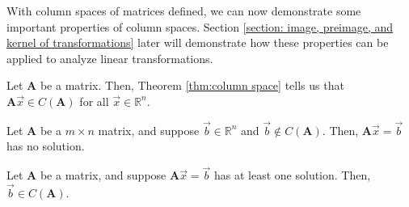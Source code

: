 \documentclass[]{book}
\newcommand{\mat}[1]{\ensuremath{\mathbf{#1}}}
\begin{document}
With column spaces of matrices defined, we can now demonstrate some important properties of column spaces. Section \ref{section: image, preimage, and kernel of transformations} later will demonstrate how these properties can be applied to analyze linear transformations.
\begin{corollary}
    Let $\mat{A}$ be a matrix. Then, Theorem \ref{thm:column space} tells us that $\mat{A} \vec{x} \in C(\mat{A})$ for all $\vec{x} \in \mathbb{R}^n$.
\end{corollary}
\begin{example}
    Let $\mat{A}$ be a $m \times n$ matrix, and suppose $\vec{b} \in \mathbb{R}^n$ and $\vec{b} \notin C(\mat{A})$. Then, $\mat{A} \vec{x} = \vec{b}$ has no solution. \hspace*{0pt} \hfill \qedsymbol
\end{example}
\begin{example}
    Let $\mat{A}$ be a matrix, and suppose $\mat{A} \vec{x} = \vec{b}$ has at least one solution. Then, $\vec{b} \in C(\mat{A})$. \hfill \qedsymbol
\end{example}
\end{document}
